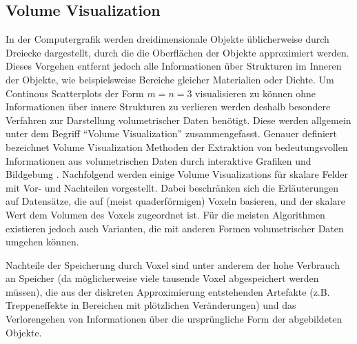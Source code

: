 \documentclass[a4paper,fontsize=12pt,toc=bib,halfparskip]{scrartcl}
\begin{document}
\subsection{Volume Visualization}
In der Computergrafik werden dreidimensionale Objekte \"ublicherweise durch Dreiecke dargestellt, durch die die Oberfl\"achen der Objekte approximiert werden. Dieses Vorgehen entfernt jedoch alle Informationen \"uber Strukturen im Inneren der Objekte, wie beispielsweise Bereiche gleicher Materialien oder Dichte. Um Continous Scatterplots der Form $m=n=3$ visualisieren zu k\"onnen ohne Informationen \"uber innere Strukturen zu verlieren werden deshalb besondere Verfahren zur Darstellung volumetrischer Daten ben\"otigt. Diese werden allgemein unter dem Begriff ``Volume Visualization'' zusammengefasst. Genauer definiert bezeichnet Volume Visualization Methoden der Extraktion von bedeutungsvollen Informationen aus volumetrischen Daten durch interaktive Grafiken und Bildgebung \cite[S.~127]{hansen2005visualization}. Nachfolgend werden einige Volume Visualizations f\"ur skalare Felder  mit Vor- und Nachteilen vorgestellt. Dabei beschr\"anken sich die Erl\"auterungen auf Datens\"atze, die auf (meist quaderf\"ormigen) Voxeln basieren, und der skalare Wert dem Volumen des Voxels zugeordnet ist. F\"ur die meisten Algorithmen existieren jedoch auch Varianten, die mit anderen Formen volumetrischer Daten umgehen k\"onnen.

Nachteile der Speicherung durch Voxel sind unter anderem der hohe Verbrauch an Speicher (da m\"oglicherweise viele tausende Voxel abgespeichert werden m\"ussen), die aus der diskreten Approximierung entstehenden Artefakte (z.B. Treppeneffekte in Bereichen mit pl\"otzlichen Ver\"anderungen) und das Verlorengehen von Informationen \"uber die urspr\"ungliche Form der abgebildeten Objekte.
\end{document}
